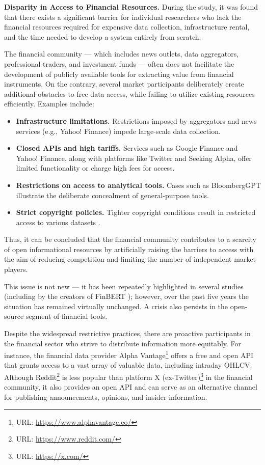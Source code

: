 \textbf{Disparity in Access to Financial Resources.} During the study, it was found that there exists a significant barrier for individual
researchers who lack the financial resources required for expensive data collection, infrastructure rental, and the time needed to develop
a system entirely from scratch.

The financial community — which includes news outlets, data aggregators, professional traders, and investment funds — often does not facilitate
the development of publicly available tools for extracting value from financial instruments. On the contrary, several market participants deliberately
create additional obstacles to free data access, while failing to utilize existing resources efficiently. Examples include:

\begin{itemize}
    \item \textbf{Infrastructure limitations.} Restrictions imposed by aggregators and news services (e.g., Yahoo! Finance) impede large-scale data collection.
    \item \textbf{Closed APIs and high tariffs.} Services such as Google Finance and Yahoo! Finance, along with platforms like Twitter and Seeking Alpha,
    offer limited functionality or charge high fees for access.
    \item \textbf{Restrictions on access to analytical tools.} Cases such as BloombergGPT illustrate the deliberate concealment of general-purpose tools.
    \item \textbf{Strict copyright policies.} Tighter copyright conditions result in restricted access to various datasets \parencite{wu2023BloombrgGpt}.
\end{itemize}

Thus, it can be concluded that the financial community contributes to a scarcity of open informational resources by artificially raising
the barriers to access with the aim of reducing competition and limiting the number of independent market players.

This issue is not new --- it has been repeatedly highlighted in several studies (including by the creators of FinBERT \parencite{Yang2020FinBERT});
however, over the past five years the situation has remained virtually unchanged. A crisis also persists in the open-source segment of financial tools.

Despite the widespread restrictive practices, there are proactive participants in the financial sector who strive to distribute information
more equitably. For instance, the financial data provider Alpha Vantage\footnote{URL: \url{https://www.alphavantage.co/}} offers a free and open API
that grants access to a vast array of valuable data, including intraday OHLCV. Although Reddit\footnote{URL: \url{https://www.reddit.com/}} is less
popular than platform X (ex-Twitter)\footnote{URL: \url{https://x.com/}} in the financial community, it also provides an open API and can serve
as an alternative channel for publishing announcements, opinions, and insider information.

